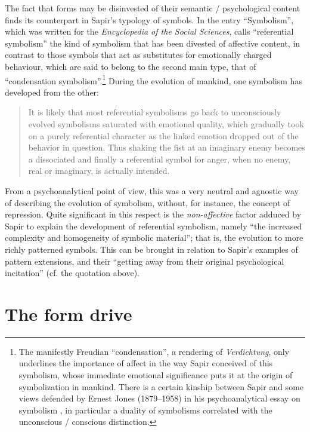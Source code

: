 \documentclass[output=paper]{langscibook}
\begin{document}
The fact that forms may be disinvested of their semantic / psychological content finds its counterpart in Sapir's typology of symbols. In the entry ``Symbolism'', which was written for the \emph{Encyclopedia of the Social Sciences}, \citet{Sapir1934} calls ``referential symbolism'' the kind of symbolism that has been divested of affective content, in contrast to those symbols that act as substitutes for emotionally charged behaviour, which are said to belong to the second main type, that of ``condensation symbolism''.\footnote{The manifestly Freudian ``condensation'', a rendering of \emph{Verdichtung}, only underlines the importance of affect in the way Sapir conceived of this symbolism, whose immediate emotional significance puts it at the origin of symbolization in mankind. There is a certain kinship between Sapir and some views defended by Ernest Jones (1879--1958) in his psychoanalytical essay on symbolism \citep{Jones1916}, in particular a duality of symbolisms correlated with the unconscious / conscious distinction.} During the evolution of mankind, one symbolism has developed from the other: 

\begin{quotation}
It is likely that most referential symbolisms go back to unconsciously evolved symbolisms saturated with emotional quality, which gradually took on a purely referential character as the linked emotion dropped out of the behavior in question. Thus shaking the fist at an imaginary enemy becomes a dissociated and finally a referential symbol for anger, when no enemy, real or imaginary, is actually intended. \citep[565]{Sapir1934}
\end{quotation}

From a psychoanalytical point of view, this was a very neutral and agnostic way of describing the evolution of symbolism, without, for instance, the concept of repression. Quite significant in this respect is the \emph{non-affective} factor adduced by Sapir to explain the development of referential symbolism, namely ``the increased complexity and homogeneity of symbolic material''; that is, the evolution to more richly patterned symbols. This can be brought in relation to Sapir's examples of pattern extensions, and their ``getting away from their original psychological incitation'' (cf. the quotation above). 

\section{The form drive}
\label{sec:fortis:formdrive}
\end{document}
